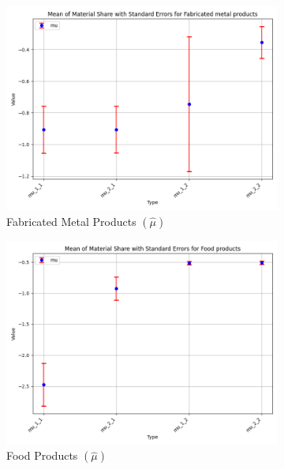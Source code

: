 \documentclass{article}
\begin{document}
\begin{figure}[ht!]
    \begin{subfigure}[t]{0.32\textwidth}
        \centering
        \includegraphics[width=\textwidth]{figure/empirical_stat_mixture_kmshare_ciiu_mu_with_error_bars_Fabricated metal products.png}
        \caption{Fabricated Metal Products $(\hat\mu)$}
    \end{subfigure}
    \begin{subfigure}[t]{0.32\textwidth}
        \centering
        \includegraphics[width=\textwidth]{figure/empirical_stat_mixture_kmshare_ciiu_mu_with_error_bars_Food products.png}
        \caption{Food Products $(\hat\mu)$}
    \end{subfigure}
    \begin{subfigure}[t]{0.32\textwidth}

\end{subfigure}
\end{figure}
\end{document}
